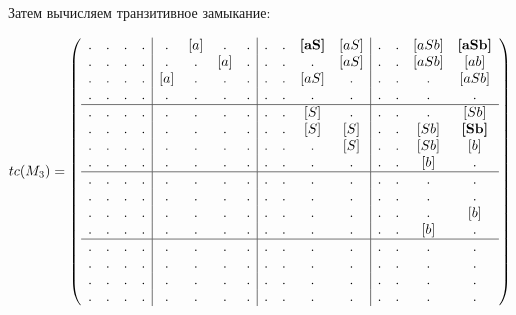 \begin{example}
Затем вычисляем транзитивное замыкание:

\begin{align}
tc(M_3) =
\left(\begin{array}{c c c c | c c c c | c c c c | c c c c } 
. & . & . & .  &  . & [a] & . & .  &  . & . & \textbf{[aS]} & [aS]  &  . & . & [aSb] & \textbf{[aSb]}  \\
. & . & . & .  &  . & . & [a] & .  &  . & . & .             & [aS]  &  . & . & [aSb] & [ab]          \\
. & . & . & .  &  [a] & . & . & .  &  . & . & [aS]          & .     &  . & . & .     & [aSb]         \\
. & . & . & .  &  . & . & . & .    &  . & . & .             & .     &  . & . & .     & .             \\
\hline
. & . & . & .  &  . & . & . & .    &  . & . & [S] & .             &  . & . & .    & [Sb]    \\
. & . & . & .  &  . & . & . & .    &  . & . & [S] & [S]           &  . & . & [Sb] & \textbf{[Sb]}    \\
. & . & . & .  &  . & . & . & .    &  . & . & .   & [S]           &  . & . & [Sb] & [b]  \\
. & . & . & .  &  . & . & . & .    &  . & . & .   & .             &  . & . & [b]  & .    \\
\hline                                                              
. & . & . & .  &  . & . & . & .    &  . & . & . & .               &  . & . & .    & .   \\
. & . & . & .  &  . & . & . & .    &  . & . & . & .               &  . & . & .    & .   \\
. & . & . & .  &  . & . & . & .    &  . & . & . & .               &  . & . & .    & [b] \\
. & . & . & .  &  . & . & . & .    &  . & . & . & .               &  . & . & [b]  & . \\
\hline                                                              
. & . & . & .  &  . & . & . & .    &  . & . & . & .               &  . & . & . & .   \\
. & . & . & .  &  . & . & . & .    &  . & . & . & .               &  . & . & . & .   \\
. & . & . & .  &  . & . & . & .    &  . & . & . & .               &  . & . & . & .   \\
. & . & . & .  &  . & . & . & .    &  . & . & . & .               &  . & . & . & . 
\end{array}\right)
\label{eq:graph_tm}
\end{align}


\end{example}
